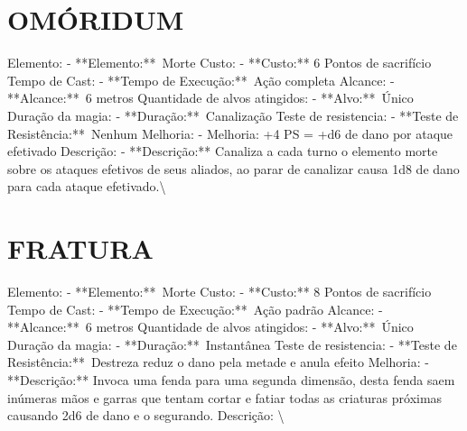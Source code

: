 \documentclass{article}%
\begin{document}
%
\section{OMÓRIDUM}%
\label{sec:OMRIDUM}%
Elemento: {-} **Elemento:**~Morte\newline%
Custo: {-} **Custo:** 6 Pontos de sacrifício\newline%
Tempo de Cast: {-} **Tempo de Execução:**~Ação completa\newline%
Alcance: {-} **Alcance:**~6 metros\newline%
Quantidade de alvos atingidos: {-} **Alvo:**~Único\newline%
Duração da magia: {-} **Duração:**~Canalização\newline%
Teste de resistencia: {-} **Teste de Resistência:**~Nenhum\newline%
Melhoria: {-} Melhoria: +4 PS = +d6 de dano por ataque efetivado\newline%
Descrição: {-} **Descrição:** Canaliza a cada turno o elemento morte sobre os ataques efetivos de seus aliados, ao parar de canalizar causa 1d8 de dano para cada ataque efetivado.\textbackslash{}

%
\section{FRATURA}%
\label{sec:FRATURA}%
Elemento: {-} **Elemento:**~Morte\newline%
Custo: {-} **Custo:** 8 Pontos de sacrifício\newline%
Tempo de Cast: {-} **Tempo de Execução:**~Ação padrão\newline%
Alcance: {-} **Alcance:**~6 metros\newline%
Quantidade de alvos atingidos: {-} **Alvo:**~Único\newline%
Duração da magia: {-} **Duração:**~Instantânea\newline%
Teste de resistencia: {-} **Teste de Resistência:**~Destreza reduz o dano pela metade e anula efeito\newline%
Melhoria: {-} **Descrição:** Invoca uma fenda para uma segunda dimensão, desta fenda saem inúmeras mãos e garras que tentam cortar e fatiar todas as criaturas próximas causando 2d6 de dano e o segurando.\newline%
Descrição: \textbackslash{}

%
\end{document}
